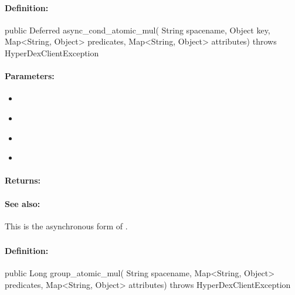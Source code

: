 \paragraph{Definition:}
\begin{javacode}
public Deferred async_cond_atomic_mul(
        String spacename,
        Object key,
        Map<String, Object> predicates,
        Map<String, Object> attributes) throws HyperDexClientException
\end{javacode}

\paragraph{Parameters:}
\begin{itemize}[noitemsep]
\item {}\\

\item {}\\

\item {}\\

\item {}\\

\end{itemize}

\paragraph{Returns:}


\paragraph{See also:}  This is the asynchronous form of .

\pagebreak
\subsubsection{}
\label{api:java:group_atomic_mul}


\paragraph{Definition:}
\begin{javacode}
public Long group_atomic_mul(
        String spacename,
        Map<String, Object> predicates,
        Map<String, Object> attributes) throws HyperDexClientException
\end{javacode}

